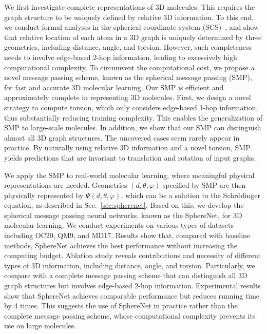 \documentclass{article}
\begin{document}
We first investigate complete representations of 3D molecules.
This requires the graph structure to be uniquely defined by relative 3D information.
To this end, we conduct formal analyses in the spherical coordinate system (SCS)~\citep{chen2019clusternet}, and show that
relative location of each atom in a 3D graph is uniquely determined by three geometries, including distance, angle, and torsion.
However, such completeness needs to involve edge-based 2-hop information, leading to excessively high computational complexity.
To circumvent the computational cost, we propose a novel message passing scheme, known
as the spherical message passing (SMP),
for fast and accurate 3D molecular learning. 
Our SMP is efficient and approximately complete in representing 3D molecules.
First, we design a novel strategy to compute torsion, which only
considers edge-based 1-hop information, thus substantially reducing training complexity.
This enables the generalization of SMP to large-scale molecules.
In addition, we show that our SMP can distinguish almost all 3D graph structures.
The uncovered cases seem rarely appear in practice.
By naturally using relative 3D information and a novel torsion, SMP yields predictions that are invariant to
translation and rotation of input graphs.

We apply the SMP to real-world molecular learning, where
meaningful physical representations are needed.
\textcolor{COLOR}{Geometries $(d, \theta, \varphi)$ specified by SMP are then physically represented 
by $\Psi(d, \theta, \varphi)$, which can be a solution 
to the Schrödinger equation,
as described in Sec.~\ref{sec:spherenet}.
}
Based on this, we develop the spherical message passing neural networks,
known as the SphereNet, for 3D molecular learning.
We conduct experiments on various types of datasets including
OC20, QM9, and MD17.
Results show that, compared with baseline methods, SphereNet achieves the best performance without increasing the computing budget.
Ablation study reveals contributions and necessity of different types of 3D information, including 
distance, angle, and torsion.
Particularly, we compare with a complete message passing scheme that can distinguish all 3D graph structures but involves edge-based 2-hop information.
Experimental results
show that SphereNet achieves comparable performance but reduces running time by 4 times.
This suggests the use of SphereNet in practice rather than the complete message passing scheme, whose computational complexity prevents its use
on large molecules.
\end{document}
